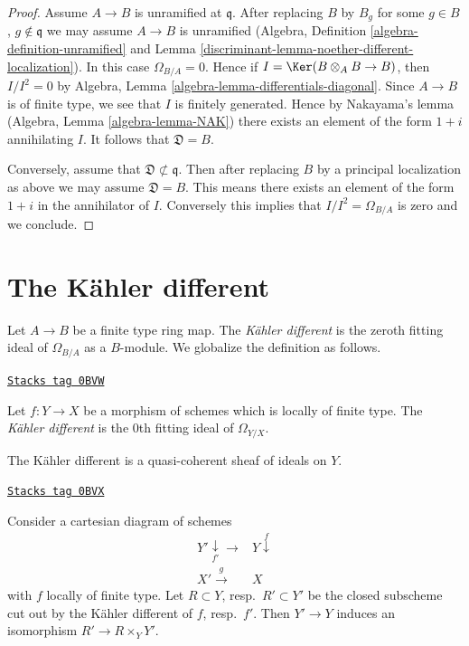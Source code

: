 \begin{proof}

Assume $A \to B$ is unramified at $\mathfrak q$. After replacing
$B$ by $B_g$ for some $g \in B$, $g \not \in \mathfrak q$ we may
assume $A \to B$ is unramified (Algebra, Definition
\ref{algebra-definition-unramified} and
Lemma \ref{discriminant-lemma-noether-different-localization}).
In this case $\Omega_{B/A} = 0$. Hence if $I = \Ker(B \otimes_A B \to B)$,
then $I/I^2 = 0$ by
Algebra, Lemma \ref{algebra-lemma-differentials-diagonal}.
Since $A \to B$ is of finite type, we see that $I$ is finitely
generated. Hence by Nakayama's lemma
(Algebra, Lemma \ref{algebra-lemma-NAK})
there exists an element of the form $1 + i$
annihilating $I$. It follows that $\mathfrak{D} = B$.

\medskip\noindent
Conversely, assume that $\mathfrak{D} \not \subset \mathfrak q$.
Then after replacing $B$ by a principal localization as above
we may assume $\mathfrak{D} = B$. This means there exists an
element of the form $1 + i$ in the annihilator of $I$.
Conversely this implies that $I/I^2 = \Omega_{B/A}$ is zero
and we conclude.
\end{proof}

\section{The K\"ahler different}
\label{discriminant-section-kahler-different}
Let $A \to B$ be a finite type ring map. The {\it K\"ahler different} is the
zeroth fitting ideal of $\Omega_{B/A}$ as a $B$-module. We globalize the
definition as follows.

\begin{definition}
\label{discriminant-definition-kahler-different}
\href{https://stacks.math.columbia.edu/tag/0BVW}{\texttt{Stacks tag 0BVW}}

Let $f : Y \to X$ be a morphism of schemes which is locally of finite type.
The {\it K\"ahler different} is the $0$th fitting ideal of $\Omega_{Y/X}$.
\end{definition}

The K\"ahler different is a quasi-coherent sheaf of ideals on $Y$.

\begin{lemma}
\label{discriminant-lemma-base-change-kahler-different}
\href{https://stacks.math.columbia.edu/tag/0BVX}{\texttt{Stacks tag 0BVX}}

Consider a cartesian diagram of schemes
$$
\begin{array}{cc}Y' \underset{f'}{\downarrow}\longrightarrow & Y \overset{f}{\downarrow} \\ X' \overset{g}{\longrightarrow} & X\end{array}
$$
with $f$ locally of finite type. Let $R \subset Y$, resp.\ $R' \subset Y'$
be the closed subscheme cut out by the K\"ahler different of $f$, resp.\ $f'$.
Then $Y' \to Y$ induces an isomorphism $R' \to R \times_Y Y'$.
\end{lemma}

